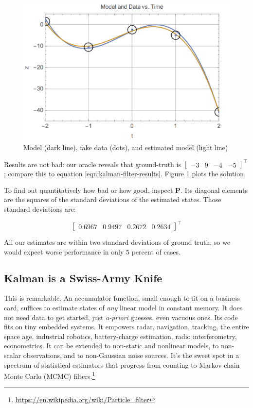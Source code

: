 \documentclass[10pt,oneside,x11names]{article}
\begin{document}
\begin{enumerate}
\begin{figure}[htb]
\centering
\includegraphics[width=.9\linewidth]{small_solution.png}
\caption{\label{fig:orgparagraph2}
Model (dark line), fake data (dots), and estimated model (light line)}
\end{figure}

Results are not bad: our oracle reveals that ground-truth is
\(\begin{bmatrix}-3& 9& -4& -5\end{bmatrix}^\intercal\); compare
this to equation \ref{eqn:kalman-filter-results}.
Figure \ref{fig:orgparagraph2} plots the solution.

To find out quantitatively how bad or how good,  inspect
\(\mathbold{P}\). Its diagonal elements are the squares of the
standard deviations of the estimated states. Those standard deviations are:

\begin{equation*}
\begin{bmatrix}
0.6967 & 0.9497 & 0.2672 & 0.2634
\end{bmatrix}
^\intercal
\end{equation*}

All our estimates are within two standard deviations of
ground truth, so we would expect worse performance in only \(5\) percent of
cases.
\end{enumerate}

\subsection{Kalman is a Swiss-Army Knife}
\label{sec:orgheadline18}

This is remarkable. An accumulator function, small enough to fit on a business
card, suffices to estimate states of \emph{any} linear model in constant memory. It
does not need data to get started, just \emph{a-priori} guesses, even vacuous ones.
Its code fits on tiny embedded systems. It empowers radar, navigation,
tracking, the entire space age, industrial robotics, battery-charge estimation,
radio interferometry, econometrics. It can be extended to non-static and
nonlinear models, to non-scalar observations, and to non-Gaussian noise sources.
It's the sweet spot in a spectrum of statistical estimators that progress from
counting to Markov-chain Monte Carlo (MCMC) filters.\footnote{\url{https://en.wikipedia.org/wiki/Particle_filter}}
\end{document}
